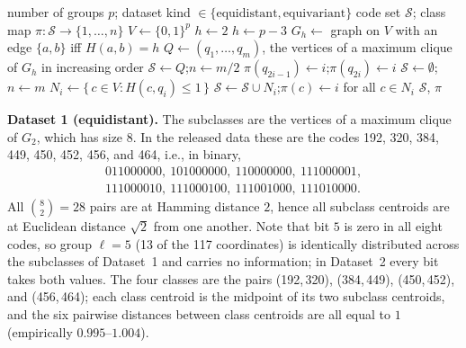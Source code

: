 \documentclass[../ppgc-tese.tex]{subfiles}
\begin{document}
\begin{algorithm}[ht]
    \caption{Selection of subclass codes and class map.}
    \label{alg:codes}
    \begin{algorithmic}[1]
        \REQUIRE number of groups $p$; dataset kind $\in \{\text{equidistant}, \text{equivariant}\}$
        \ENSURE code set $\mathcal{S}$; class map $\pi: \mathcal{S} \to \{1, \dots, n\}$
        \STATE $V \gets \{0,1\}^p$ 
            \STATE $h \gets 2$
        \ELSE
            \STATE $h \gets p - 3$
        \ENDIF
        \STATE $G_h \gets$ graph on $V$ with an edge $\{a, b\}$ iff $H(a, b) = h$
        \STATE $Q \gets (q_1, \dots, q_m)$, the vertices of a maximum clique of $G_h$ in increasing order
            \STATE $\mathcal{S} \gets Q$;\quad $n \gets m/2$ 
                \STATE $\pi(q_{2i-1}) \gets i$;\quad $\pi(q_{2i}) \gets i$ 
            \ENDFOR
        \ELSE
            \STATE $\mathcal{S} \gets \emptyset$;\quad $n \gets m$ 
                \STATE $N_i \gets \{\, c \in V : H(c, q_i) \leq 1 \,\}$ 
                \STATE $\mathcal{S} \gets \mathcal{S} \cup N_i$;\quad $\pi(c) \gets i$ for all $c \in N_i$
            \ENDFOR
        \ENDIF
        \RETURN $\mathcal{S}$, $\pi$
    \end{algorithmic}
\end{algorithm}


\noindent\textbf{Dataset 1 (equidistant).}
The subclasses are the vertices of a maximum clique of $G_2$, which has size $8$. In the released data these are the codes 192, 320, 384, 449, 450, 452, 456, and 464, i.e., in binary,
\begin{gather*}
011000000,\ 101000000,\ 110000000,\ 111000001,\\
111000010,\ 111000100,\ 111001000,\ 111010000.
\end{gather*}
All $\binom{8}{2} = 28$ pairs are at Hamming distance $2$, hence all subclass centroids are at Euclidean distance $\sqrt{2}$ from one another. Note that bit $5$ is zero in all eight codes, so group $\ell = 5$ (13 of the 117 coordinates) is identically distributed across the subclasses of Dataset~1 and carries no information; in Dataset~2 every bit takes both values. The four classes are the pairs (192,\,320), (384,\,449), (450,\,452), and (456,\,464); each class centroid is the midpoint of its two subclass centroids, and the six pairwise distances between class centroids are all equal to $1$ (empirically $0.995$--$1.004$).
\end{document}
